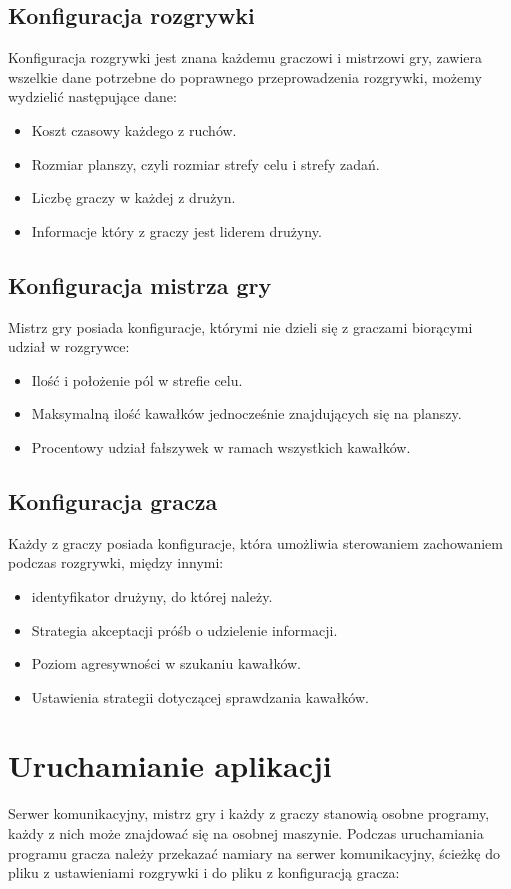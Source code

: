 \documentclass[a4paper]{article}
\begin{document}
\subsection{Konfiguracja rozgrywki}
Konfiguracja rozgrywki jest znana każdemu graczowi i mistrzowi gry, zawiera wszelkie dane potrzebne do poprawnego przeprowadzenia rozgrywki, możemy wydzielić następujące dane:
  \begin{itemize}
  \item
    Koszt czasowy każdego z ruchów.
  \item
    Rozmiar planszy, czyli rozmiar strefy celu i strefy zadań.
  \item 
    Liczbę graczy w każdej z drużyn.
  \item 
    Informacje który z graczy jest liderem drużyny.
  \end{itemize}

\subsection{Konfiguracja mistrza gry}
Mistrz gry posiada konfiguracje, którymi nie dzieli się z graczami biorącymi udział w rozgrywce:
  \begin{itemize}
  \item
    Ilość i położenie pól w strefie celu.
  \item
    Maksymalną ilość kawałków jednocześnie znajdujących się na planszy.
  \item 
    Procentowy udział fałszywek w ramach wszystkich kawałków.
  \end{itemize}
  
\subsection{Konfiguracja gracza}
Każdy z graczy posiada konfiguracje, która umożliwia sterowaniem zachowaniem podczas rozgrywki, między innymi:
  \begin{itemize}
  \item
    identyfikator drużyny, do której należy. 
  \item
    Strategia akceptacji próśb o udzielenie informacji.
  \item
    Poziom agresywności w szukaniu kawałków.
  \item
    Ustawienia strategii dotyczącej sprawdzania kawałków. 
  \end{itemize}
 

\section{Uruchamianie aplikacji}
Serwer komunikacyjny, mistrz gry i każdy z graczy stanowią osobne programy, każdy z nich może znajdować się na osobnej maszynie. Podczas uruchamiania programu gracza należy przekazać namiary na serwer komunikacyjny, ścieżkę do pliku z ustawieniami rozgrywki i do pliku z konfiguracją gracza:
\end{document}
